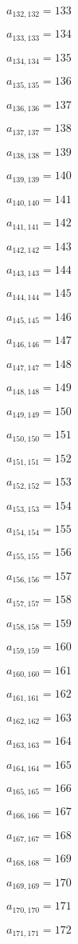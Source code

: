 \documentclass[a4paper,12pt]{article}
\begin{document}
$a _{ 132, 132 } = 133$

$a _{ 133, 133 } = 134$

$a _{ 134, 134 } = 135$

$a _{ 135, 135 } = 136$

$a _{ 136, 136 } = 137$

$a _{ 137, 137 } = 138$

$a _{ 138, 138 } = 139$

$a _{ 139, 139 } = 140$

$a _{ 140, 140 } = 141$

$a _{ 141, 141 } = 142$

$a _{ 142, 142 } = 143$

$a _{ 143, 143 } = 144$

$a _{ 144, 144 } = 145$

$a _{ 145, 145 } = 146$

$a _{ 146, 146 } = 147$

$a _{ 147, 147 } = 148$

$a _{ 148, 148 } = 149$

$a _{ 149, 149 } = 150$

$a _{ 150, 150 } = 151$

$a _{ 151, 151 } = 152$

$a _{ 152, 152 } = 153$

$a _{ 153, 153 } = 154$

$a _{ 154, 154 } = 155$

$a _{ 155, 155 } = 156$

$a _{ 156, 156 } = 157$

$a _{ 157, 157 } = 158$

$a _{ 158, 158 } = 159$

$a _{ 159, 159 } = 160$

$a _{ 160, 160 } = 161$

$a _{ 161, 161 } = 162$

$a _{ 162, 162 } = 163$

$a _{ 163, 163 } = 164$

$a _{ 164, 164 } = 165$

$a _{ 165, 165 } = 166$

$a _{ 166, 166 } = 167$

$a _{ 167, 167 } = 168$

$a _{ 168, 168 } = 169$

$a _{ 169, 169 } = 170$

$a _{ 170, 170 } = 171$

$a _{ 171, 171 } = 172$
\end{document}
